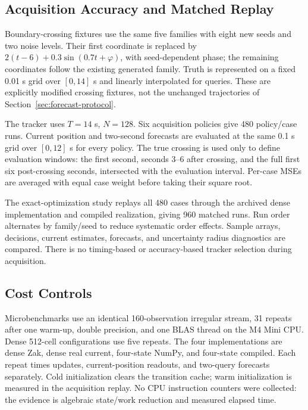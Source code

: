 \documentclass[journal]{IEEEtran}
\begin{document}
\subsection{Acquisition Accuracy and Matched Replay}

Boundary-crossing fixtures use the same five families with eight new
seeds and two noise levels. Their first coordinate is replaced by
$2(t-6)+0.3\sin(0.7t+\varphi)$, with seed-dependent phase; the remaining
coordinates follow the existing generated family. Truth is represented
on a fixed 0.01 s grid over $[0,14]$ s and linearly interpolated for
queries. These are explicitly modified crossing fixtures, not the
unchanged trajectories of Section~\ref{sec:forecast-protocol}.

The tracker uses $T=14$ s, $N=128$. Six acquisition policies give 480
policy/case runs. Current position and two-second forecasts are evaluated
at the same 0.1 s grid over $[0,12]$ s for every policy. The true crossing
is used only to define evaluation windows: the first second, seconds
3--6 after crossing, and the full first six post-crossing seconds,
intersected with the evaluation interval. Per-case MSEs are averaged
with equal case weight before taking their square root.

The exact-optimization study replays all 480 cases through the archived
dense implementation and compiled realization, giving 960 matched runs.
Run order alternates by family/seed to reduce systematic order effects.
Sample arrays, decisions, current estimates, forecasts, and uncertainty
radius diagnostics are compared. There is no timing-based or
accuracy-based tracker selection during acquisition.

\subsection{Cost Controls}

Microbenchmarks use an identical 160-observation irregular stream, 31
repeats after one warm-up, double precision, and one BLAS thread on the
M4 Mini CPU. Dense 512-cell configurations use five repeats. The four
implementations are dense Zak, dense real current, four-state NumPy,
and four-state compiled. Each repeat times updates, current-position
readouts, and two-query forecasts separately. Cold initialization clears
the transition cache; warm initialization is measured in the acquisition
replay. No CPU instruction counters were collected: the evidence is
algebraic state/work reduction and measured elapsed time.
\end{document}
